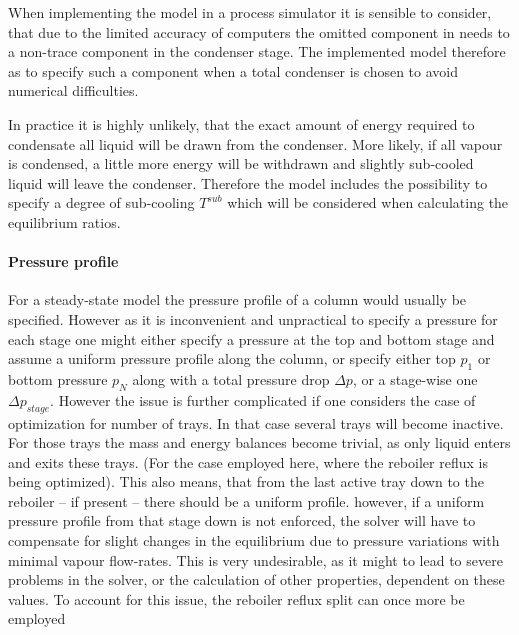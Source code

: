         When implementing the model in a process simulator it is sensible to consider, that due to
        the limited accuracy of computers the omitted component in  needs to
        a non-trace component in the condenser stage. The implemented model therefore as to specify
        such a component when a total condenser is chosen to avoid numerical difficulties.

        In practice it is highly unlikely, that the exact amount of energy required to condensate all
        liquid will be drawn from the condenser. More likely, if all vapour is condensed, a little more
        energy will be withdrawn and slightly sub-cooled liquid will leave the condenser. Therefore
        the model includes the possibility to specify a degree of sub-cooling $T^{sub}$ which will be
        considered when calculating the equilibrium ratios.

    \paragraph{Pressure profile}
        For a steady-state model the pressure profile of a column would usually be specified. However as it
        is inconvenient and unpractical to specify a pressure for each stage one might either specify
        a pressure at the top and bottom stage and assume a uniform pressure profile along the column, or
        specify either top $p_1$ or bottom pressure $p_N$ along with a total pressure drop $\Delta p$,
        or a stage-wise one $\Delta p_{stage}$. However the issue is further complicated if one considers the
        case of optimization for number of trays. In that case several trays will become inactive. For those
        trays the mass and energy balances become trivial, as only liquid enters and exits these trays.
        (For the case employed here, where the reboiler reflux is being optimized). This also means,
        that from the last active tray down to the reboiler -- if present -- there should be a uniform
        profile. however, if a uniform pressure profile from that stage down is not enforced, the solver
        will have to compensate for slight changes in the equilibrium due to pressure variations with minimal
        vapour flow-rates. This is very undesirable, as it might to lead to severe problems in the solver,
        or the calculation of other properties, dependent on these values. To account for this issue, the reboiler
        reflux split can once more be employed

